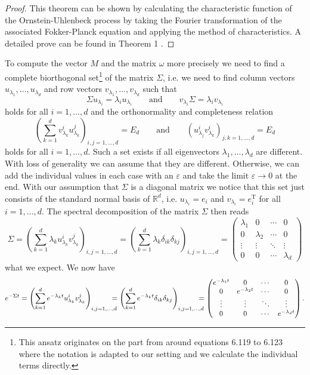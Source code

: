\documentclass[11pt,titlepage]{article}
\newcommand{\R}{\mathbb{R}} %
\theoremstyle{definition}
\theoremstyle{remark}
\begin{document}
	\begin{proof}
		This theorem can be shown by calculating the characteristic function of the 
		Ornstein-Uhlenbeck process by taking the Fourier transformation of the 
		associated Fokker-Planck equation and applying the method of characteristics. 
		A detailed prove can be found in Theorem 1 \cite{Vatiwutipong2019}.
	\end{proof}
	
	To compute the vector $M$ and the matrix $\omega$ more precisely we need to find a complete biorthogonal set\footnote{This ansatz originates on the part from \cite{Risken1996} around equations 6.119 to 6.123 where the notation is adapted to our setting and we calculate the individual terms directly.} of 
	the matrix $\Sigma$, i.e. we need to find column vectors $u_{\lambda_1},\ldots,u_{\lambda_d}$ and row vectors $v_{\lambda_1},\ldots,v_{\lambda_d}$ such that
	\[\Sigma u_{\lambda_i}=\lambda_i u_{\lambda_i}\qquad \text{and} \qquad
	v_{\lambda_i}\Sigma=\lambda_i v_{\lambda_i}\]
	holds for all $i=1,\ldots,d$ and the orthonormality and completeness relation
	\[\left(\sum_{k=1}^d v_{\lambda_k}^i u_{\lambda_k}^j\right)_{i,j=1,\ldots,d}=E_d\qquad 
	\text{and} \qquad \left(u_{\lambda_j}^i v_{\lambda_k}^i\right)_{j,k=1,\ldots,d} = E_d\]
	holds for all $i=1,\ldots,d$. Such a set exists if all eigenvectors $\lambda_1,\ldots,\lambda_d$ are different. With loss of generality we can assume that they are different. Otherwise, we can add the individual values in each case with an $\varepsilon$ and take the limit $\varepsilon\to 0$ at the end. With our assumption that $\Sigma$ is a diagonal matrix we notice that this set just consists of the standard normal basis of $\R^d$, i.e. 
	$u_{\lambda_i}=e_i$ and $v_{\lambda_i}=e_i^{\text{T}}$ for all $i=1,\ldots,d$. 
	The spectral decomposition of the matrix $\Sigma$ then reads
	\[\Sigma = \left(\sum_{k=1}^d \lambda_k u_{\lambda_k}^i v_{\lambda_k}^j\right)_{i,j=1,\ldots,d}=\left(\sum_{k=1}^d \lambda_k \delta_{ik}\delta_{kj}\right)_{i,j=1,\ldots,d} = 
	\begin{pmatrix}
		\lambda_1 & 0 &\cdots & 0 \\
		0 & \lambda_2 & \cdots & 0 \\
		\vdots & \vdots & \ddots & \vdots \\
		0 & 0 & \cdots & \lambda_d
	\end{pmatrix}\]
	what we expect. We now have 
	\begin{align*}
		e^{-\Sigma t} = \left(\sum_{k=1}^d e^{-\lambda_k t}u_{\lambda_k}^i v_{\lambda_k}^j\right)_{i,j=1,\ldots,d}
		\hspace{-1em}=\left(\sum_{k=1}^d e^{-\lambda_k t}\delta_{ik}\delta_{kj}\right)_{i,j=1,\ldots,d}
		\hspace{-1em}= 
		\begin{pmatrix}
			e^{-\lambda_1 t} & 0 &\cdots & 0 \\
			0 & e^{-\lambda_2 t} & \cdots & 0 \\
			\vdots & \vdots & \ddots & \vdots \\
			0 & 0 & \cdots & e^{-\lambda_d t}
		\end{pmatrix}.
	\end{align*}
\end{document}
